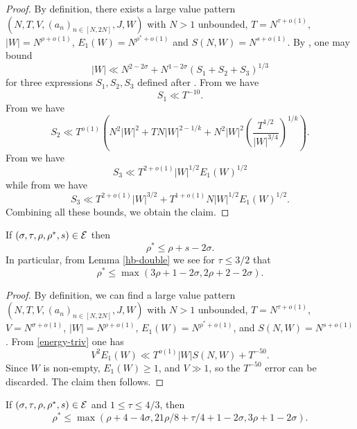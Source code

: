 \literature
{}

\begin{proof} By definition, there exists a large value pattern $(N,T,V,(a_n)_{n \in [N,2N]},J,W)$ with $N>1$ unbounded, $T = N^{\tau+o(1)}$, $|W| = N^{\rho+o(1)}$, $E_1(W) = N^{\rho^*+o(1)}$ and $S(N,W) = N^{s+o(1)}$.  By \cite[Proposition 4.6, (5.5)]{guth-maynard}, one may bound
$$ |W| \ll N^{2-2\sigma} + N^{1-2\sigma} (S_1 + S_2 + S_3)^{1/3}$$
for three expressions $S_1, S_2, S_3$ defined after \cite[(5.5)]{guth-maynard}.  From \cite[Proposition 5.1]{guth-maynard} we have
$$ S_1 \ll T^{-10}.$$
From \cite[Proposition 6.1]{guth-maynard} we have
$$ S_2 \ll T^{o(1)} ( N^2 |W|^2 + T N |W|^{2-1/k} + N^2 |W|^2 (\frac{T^{1/2}}{|W|^{3/4}})^{1/k} ).$$
From \cite[Proposition 8.1]{guth-maynard} we have
$$ S_3 \ll T^{2+o(1)} |W|^{1/2} E_1(W)^{1/2}$$
while from \cite[Proposition 10.1]{guth-maynard} we have
$$ S_3 \ll T^{2+o(1)} |W|^{3/2} + T^{1+o(1)} N |W|^{1/2} E_1(W)^{1/2}.$$
Combining all these bounds, we obtain the claim.
\end{proof}

\begin{lemma}\cite[Lemma 1.7]{guth-maynard}  If $(\sigma,\tau,\rho,\rho^*,s) \in \mathcal{E}$ then
$$ \rho^* \leq \rho + s - 2\sigma.$$
In particular, from Lemma \ref{hb-double} we see for $\tau \leq 3/2$ that
$$ \rho^* \leq \max(3\rho+1-2\sigma, 2\rho+2-2\sigma).$$
\end{lemma}

\literature
{}

\begin{proof} By definition, we can find a large value pattern $(N,T,V,(a_n)_{n \in [N,2N]},J,W)$ with $N>1$ unbounded, $T = N^{\tau+o(1)}$, $V = N^{\sigma+o(1)}$, $|W| = N^{\rho+o(1)}$, $E_1(W) = N^{\rho^*+o(1)}$, and $S(N,W) = N^{s+o(1)}$. From \eqref{energy-triv} one has
$$    V^2 E_1(W) \ll T^{o(1)} |W| S(N,W) + T^{-50}.$$
Since $W$ is non-empty, $E_1(W) \geq 1$, and $V \gg 1$, so the $T^{-50}$ error can be discarded.  The claim then follows.
\end{proof}


\begin{lemma}\label{gm-3}  If $(\sigma,\tau,\rho,\rho^*, s) \in \mathcal{E}$ and $1 \leq \tau \leq 4/3$, then
    $$ \rho^* \leq \max(\rho+4-4\sigma, 21\rho/8+\tau/4+1-2\sigma, 3\rho+1-2\sigma).$$
\end{lemma}


